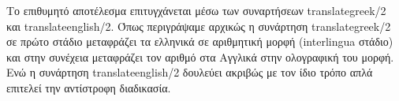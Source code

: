 \documentclass[a4paper,12pt]{article}
\begin{document}
	Το επιθυμητό αποτέλεσμα επιτυγχάνεται μέσω των συναρτήσεων translategreek/2 και translateenglish/2. Όπως περιγράψαμε αρχικώς η συνάρτηση translategreek/2 σε πρώτο στάδιο μεταφράζει τα ελληνικά σε αριθμητική μορφή (interlingua στάδιο) και στην συνέχεια μεταφράζει τον αριθμό στα Αγγλικά στην ολογραφική του μορφή. Ενώ η συνάρτηση translateenglish/2 δουλεύει ακριβώς με τον ίδιο τρόπο απλά επιτελεί την αντίστροφη διαδικασία.
\end{document}
